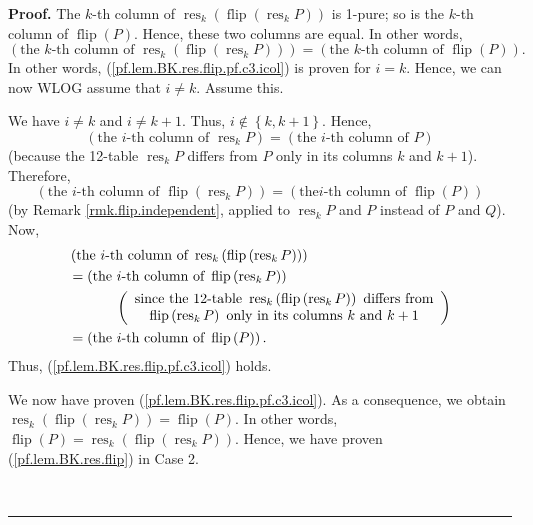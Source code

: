 \documentclass[numbers=enddot,12pt,final,onecolumn,notitlepage]{scrartcl}%
\theoremstyle{definition}
\newenvironment{proof}[1][Proof]{\noindent\textbf{#1.} }{\ \rule{0.5em}{0.5em}}
\begin{document}
\begin{proof}
The $k$-th column of $\operatorname*{res}\nolimits_{k}\left(
\operatorname*{flip}\left(  \operatorname*{res}\nolimits_{k}P\right)  \right)
$ is 1-pure; so is the $k$-th column of $\operatorname*{flip}\left(  P\right)
$. Hence, these two columns are equal. In other words,%
\[
\left(  \text{the }k\text{-th column of }\operatorname*{res}\nolimits_{k}%
\left(  \operatorname*{flip}\left(  \operatorname*{res}\nolimits_{k}P\right)
\right)  \right)  =\left(  \text{the }k\text{-th column of }%
\operatorname*{flip}\left(  P\right)  \right)  .
\]
In other words, (\ref{pf.lem.BK.res.flip.pf.c3.icol}) is proven for $i=k$.
Hence, we can now WLOG assume that $i\neq k$. Assume this.

We have $i\neq k$ and $i\neq k+1$. Thus, $i\notin\left\{  k,k+1\right\}  $.
Hence,%
\[
\left(  \text{the }i\text{-th column of }\operatorname*{res}\nolimits_{k}%
P\right)  =\left(  \text{the }i\text{-th column of }P\right)
\]
(because the 12-table $\operatorname*{res}\nolimits_{k}P$ differs from $P$
only in its columns $k$ and $k+1$). Therefore,%
\[
\left(  \text{the }i\text{-th column of }\operatorname*{flip}\left(
\operatorname*{res}\nolimits_{k}P\right)  \right)  =\left(  \text{the
}i\text{-th column of }\operatorname*{flip}\left(  P\right)  \right)
\]
(by Remark \ref{rmk.flip.independent}, applied to $\operatorname*{res}%
\nolimits_{k}P$ and $P$ instead of $P$ and $Q$). Now,%
\begin{align*}
&  \left(  \text{the }i\text{-th column of }\operatorname*{res}\nolimits_{k}%
\left(  \operatorname*{flip}\left(  \operatorname*{res}\nolimits_{k}P\right)
\right)  \right) \\
&  =\left(  \text{the }i\text{-th column of }\operatorname*{flip}\left(
\operatorname*{res}\nolimits_{k}P\right)  \right) \\
&  \ \ \ \ \ \ \ \ \ \ \left(
\begin{array}
[c]{c}%
\text{since the 12-table }\operatorname*{res}\nolimits_{k}\left(
\operatorname*{flip}\left(  \operatorname*{res}\nolimits_{k}P\right)  \right)
\text{ differs from}\\
\operatorname*{flip}\left(  \operatorname*{res}\nolimits_{k}P\right)  \text{
only in its columns }k\text{ and }k+1
\end{array}
\right) \\
&  =\left(  \text{the }i\text{-th column of }\operatorname*{flip}\left(
P\right)  \right)  .
\end{align*}
Thus, (\ref{pf.lem.BK.res.flip.pf.c3.icol}) holds.

We now have proven (\ref{pf.lem.BK.res.flip.pf.c3.icol}). As a consequence, we
obtain $\operatorname*{res}\nolimits_{k}\left(  \operatorname*{flip}\left(
\operatorname*{res}\nolimits_{k}P\right)  \right)  =\operatorname*{flip}%
\left(  P\right)  $. In other words, $\operatorname*{flip}\left(  P\right)
=\operatorname*{res}\nolimits_{k}\left(  \operatorname*{flip}\left(
\operatorname*{res}\nolimits_{k}P\right)  \right)  $. Hence, we have proven
(\ref{pf.lem.BK.res.flip}) in Case 2.


\end{proof}
\end{document}
